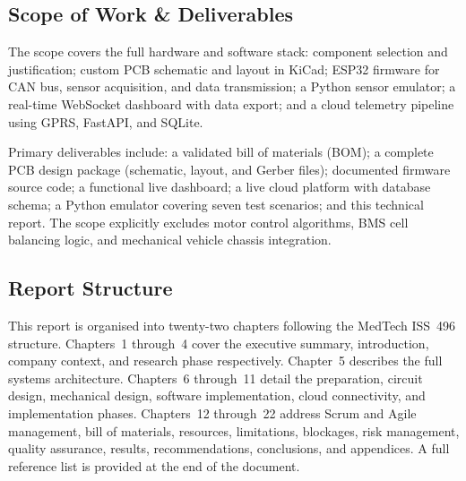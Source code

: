 \subsection{Scope of Work \& Deliverables}

The scope covers the full hardware and software stack: component selection and justification; custom PCB schematic and layout in KiCad; ESP32 firmware for CAN bus, sensor acquisition, and data transmission; a Python sensor emulator; a real-time WebSocket dashboard with data export; and a cloud telemetry pipeline using GPRS, FastAPI, and SQLite.

Primary deliverables include: a validated bill of materials (BOM); a complete PCB design package (schematic, layout, and Gerber files); documented firmware source code; a functional live dashboard; a live cloud platform with database schema; a Python emulator covering seven test scenarios; and this technical report. The scope explicitly excludes motor control algorithms, BMS cell balancing logic, and mechanical vehicle chassis integration.

\subsection{Report Structure}

This report is organised into twenty-two chapters following the MedTech ISS~496 structure. Chapters~1 through~4 cover the executive summary, introduction, company context, and research phase respectively. Chapter~5 describes the full systems architecture. Chapters~6 through~11 detail the preparation, circuit design, mechanical design, software implementation, cloud connectivity, and implementation phases. Chapters~12 through~22 address Scrum and Agile management, bill of materials, resources, limitations, blockages, risk management, quality assurance, results, recommendations, conclusions, and appendices. A full reference list is provided at the end of the document.
